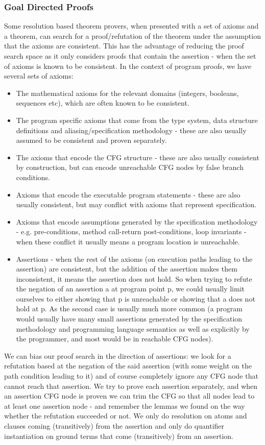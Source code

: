 	\subsubsection{Goal Directed Proofs}
	Some resolution based theorem provers, when presented with a set of axioms and a theorem, can search for a proof/refutation of the theorem under the assumption that the axioms are consistent.
	This has the advantage of reducing the proof search space as it only considers proofs that contain the assertion - when the set of axioms is known to be consistent.
	In the context of program proofs, we have several sets of axioms:
	\begin{itemize}
	\item The mathematical axioms for the relevant domains (integers, booleans, sequences etc), which are often known to be consistent.
	\item The program specific axioms that come from the type system, data structure definitions and aliasing/specification methodology - these are also usually assumed to be consistent and proven separately.
	\item The axioms that encode the CFG structure - these are also usually consistent by construction, but can encode unreachable CFG nodes by false branch conditions.
	\item Axioms that encode the executable program statements - these are also usually consistent, but may conflict with axioms that represent specification.
	\item Axioms that encode assumptions generated by the specification methodology - e.g. pre-conditions, method call-return post-conditions, loop invariants - when these conflict it usually means a program location is unreachable.
	\item Assertions - when the rest of the axioms (on execution paths leading to the assertion) are consistent, but the addition of the assertion makes them inconsistent, it means the assertion does not hold.
	So when trying to refute the negation of an assertion a at program point p, we could usually limit ourselves to either showing that p is unreachable or showing that a does not hold at p.
	As the second case is usually much more common (a program would usually have many small assertions generated by the specification methodology and programming language semantics as well as explicitly by the programmer, and most would be in reachable CFG nodes).
	\end{itemize}
	We can bias our proof search in the direction of assertions: we look for a refutation based at the negation of the said assertion (with some weight on the path condition leading to it) and of course completely ignore any CFG node that cannot reach that assertion.
	We try to prove each assertion separately, and when an assertion CFG node is proven we can trim the CFG so that all nodes lead to at least one assertion node - and remember the lemmas we found on the way whether the refutation succeeded or not.
	We only do resolution on atoms and clauses coming (transitively) from the assertion and only do quantifier instantiation on ground terms that come (transitively) from an assertion.
